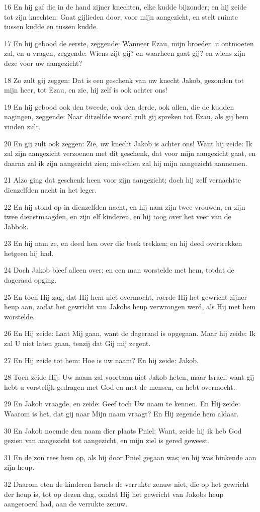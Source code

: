 \par 16 En hij gaf die in de hand zijner knechten, elke kudde bijzonder; en hij zeide tot zijn knechten: Gaat gijlieden door, voor mijn aangezicht, en stelt ruimte tussen kudde en tussen kudde.
\par 17 En hij gebood de eerste, zeggende: Wanneer Ezau, mijn broeder, u ontmoeten zal, en u vragen, zeggende: Wiens zijt gij? en waarheen gaat gij? en wiens zijn deze voor uw aangezicht?
\par 18 Zo zult gij zeggen: Dat is een geschenk van uw knecht Jakob, gezonden tot mijn heer, tot Ezau, en zie, hij zelf is ook achter ons!
\par 19 En hij gebood ook den tweede, ook den derde, ook allen, die de kudden nagingen, zeggende: Naar ditzelfde woord zult gij spreken tot Ezau, als gij hem vinden zult.
\par 20 En gij zult ook zeggen: Zie, uw knecht Jakob is achter ons! Want hij zeide: Ik zal zijn aangezicht verzoenen met dit geschenk, dat voor mijn aangezicht gaat, en daarna zal ik zijn aangezicht zien; misschien zal hij mijn aangezicht aannemen.
\par 21 Alzo ging dat geschenk heen voor zijn aangezicht; doch hij zelf vernachtte dienzelfden nacht in het leger.
\par 22 En hij stond op in dienzelfden nacht, en hij nam zijn twee vrouwen, en zijn twee dienstmaagden, en zijn elf kinderen, en hij toog over het veer van de Jabbok.
\par 23 En hij nam ze, en deed hen over die beek trekken; en hij deed overtrekken hetgeen hij had.
\par 24 Doch Jakob bleef alleen over; en een man worstelde met hem, totdat de dageraad opging.
\par 25 En toen Hij zag, dat Hij hem niet overmocht, roerde Hij het gewricht zijner heup aan, zodat het gewricht van Jakobs heup verwrongen werd, als Hij met hem worstelde.
\par 26 En Hij zeide: Laat Mij gaan, want de dageraad is opgegaan. Maar hij zeide: Ik zal U niet laten gaan, tenzij dat Gij mij zegent.
\par 27 En Hij zeide tot hem: Hoe is uw naam? En hij zeide: Jakob.
\par 28 Toen zeide Hij: Uw naam zal voortaan niet Jakob heten, maar Israel; want gij hebt u vorstelijk gedragen met God en met de mensen, en hebt overmocht.
\par 29 En Jakob vraagde, en zeide: Geef toch Uw naam te kennen. En Hij zeide: Waarom is het, dat gij naar Mijn naam vraagt? En Hij zegende hem aldaar.
\par 30 En Jakob noemde den naam dier plaats Pniel: Want, zeide hij ik heb God gezien van aangezicht tot aangezicht, en mijn ziel is gered geweest.
\par 31 En de zon rees hem op, als hij door Pniel gegaan was; en hij was hinkende aan zijn heup.
\par 32 Daarom eten de kinderen Israels de verrukte zenuw niet, die op het gewricht der heup is, tot op dezen dag, omdat Hij het gewricht van Jakobs heup aangeroerd had, aan de verrukte zenuw.

